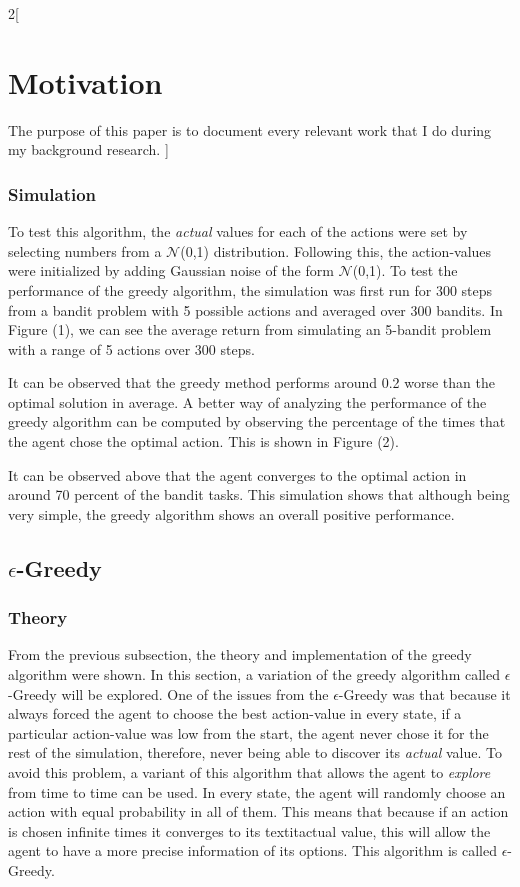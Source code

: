 \documentclass[a4paper]{article}
\begin{document}
\begin{multicols}{2}[
		\section*{Motivation}
		The purpose of this paper is to document every relevant work that I do during my background research.
		]
		\subsubsection{Simulation}
		To test this algorithm, the \textit{actual} values for each of the actions were set by selecting numbers from a $\mathcal{N}$(0,1) distribution. Following this, the action-values were initialized by adding Gaussian noise of the form $\mathcal{N}$(0,1). To test the performance of the greedy algorithm, the simulation was first run for 300 steps from a bandit problem with 5 possible actions and averaged over 300 bandits. In Figure (1), we can see the average return from simulating an 5-bandit problem with a range of 5 actions over 300 steps.

		It can be observed that the greedy method performs around 0.2 worse than the optimal solution in average. A better way of analyzing the performance of the greedy algorithm can be computed by observing the percentage of the times that the agent chose the optimal action. This is shown in Figure (2).

		
		It can be observed above that the agent converges to the optimal action in around 70 percent of the bandit tasks. This simulation shows that although being very simple, the greedy algorithm shows an overall positive performance.
		
		\subsection{$\epsilon$-Greedy}
		\subsubsection{Theory}
		From the previous subsection, the theory and implementation of the greedy algorithm were shown. In this section, a variation of the greedy algorithm called $\epsilon$-Greedy will be explored. One of the issues from the $\epsilon$-Greedy was that because it always forced the agent to choose the best action-value in every state, if a particular action-value was low from the start, the agent never chose it for the rest of the simulation, therefore, never being able to discover its \textit{actual} value. To avoid this problem, a variant of this algorithm that allows the agent to \textit{explore} from time to time can be used. In every state, the agent will randomly choose an action with equal probability in all of them. This means that because if an action is chosen infinite times it converges to its textit{actual} value, this will allow the agent to have a more precise information of its options. This algorithm is called $\epsilon$-Greedy.
		

\end{multicols}
\end{document}
